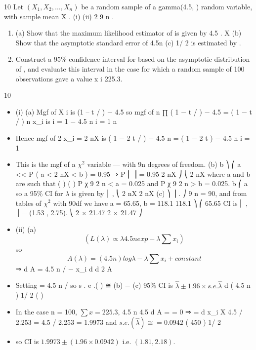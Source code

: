 \documentclass[a4paper,12pt]{article}
\begin{document}
10
Let $(X_1 , X_2 , \ldots , X_n )$ be a random sample of a gamma(4.5, ) random variable, with sample mean X .
(i)
(ii)
2
9 n .

\begin{enumerate}
\ite m(a) Using moment generating functions, show that 2 nX ~
(b) Construct a 95\% confidence interval for , based on X and the result in (i)(a) above.
(c) Evaluate the interval in (i)(b) above in the case for which a random sample of 10 observations gave a value
x i 21.47
\item 
(a) Show that the maximum likelihood estimator of is given by
4.5
.
X
(b) Show that the asymptotic standard error of
4.5n
(c)
1/ 2
is estimated by
.
\item 
Construct a 95\% confidence interval for based on the asymptotic distribution of , and evaluate this interval in the case for which a
random sample of 100 observations gave a value x i 225.3.
\end{enumerate}

\newpage

10
\begin{itemize}
\item (i)
(a)
Mgf of X i is (1 – t / \lambda ) − 4.5 so mgf of
n
∏ ( 1 − t / \lambda )
− 4.5
= ( 1 − t / \lambda )
n
\sum x_i
is
i = 1
− 4.5 n
i = 1
n
\item Hence mgf of 2 \lambda \sum x_i = 2 \lambda nX is ( 1 − 2 \lambda t / \lambda )
− 4.5 n
= ( 1 − 2 t )
− 4.5 n
i = 1
\item 
This is the mgf of a $\chi^2$ variable — with 9n degrees of freedom.
(b)
b ⎞
⎛ a
<\lambda<
P ( a < 2 \lambda nX < b ) = 0.95 ⇒ P ⎜
⎟ = 0.95
2 nX ⎠
⎝ 2 nX
where a and b are such that
(
)
(
)
P χ 9 2 n < a = 0.025 and P χ 9 2 n > b = 0.025.
b
⎛ a
so a 95\% CI for $\lambda$ is given by ⎜
,
⎝ 2 nX 2 nX
(c)
⎞
⎟ .
⎠
9 n = 90, and from tables of $\chi^2$ with 90df we have a = 65.65, b = 118.1
118.1 ⎞
⎛ 65.65
CI is ⎜
,
⎟ = (1.53 , 2.75).
⎝ 2 × 21.47 2 × 21.47 ⎠
\item (ii)
(a)
\[(
L ( \lambda ) ∝ \lambda 4.5 n exp −\lambda \sum x_i
)\]
so
\[A ( \lambda ) = ( 4.5 n ) log \lambda − \lambda \sum x_i + constant\]
⇒
d A
= 4.5 n / \lambda − \sum x_i
d \lambda
d 2 A

\item Setting
= 4.5 n /  so s . e .( \hat{\lambda} ) ≅
(b) −
(c) 95\% CI is $\hat{\lambda} \pm 1.96 × s . e . \hat{\lambda}$
d 
{
\hat{\lambda}
( 4.5 n ) 1/ 2
( ) }
\item In the case n = 100, $\sum x = 225.3$,
4.5 n 4.5
d A
=
= 0 ⇒ \hat{\lambda} =
d \lambda
\sum x_i X
4.5 / 2.253
\hat{\lambda} = 4.5 / 2.253 = 1.9973 and $s . e .( \hat{\lambda} ) ≅
= 0.0942$
( 450 ) 1/ 2
\item so CI is $1.9973 \pm (1.96 \times 0.0942)$ i.e. $(1.81 , 2.18)$.
\end{itemize}
\end{document}
